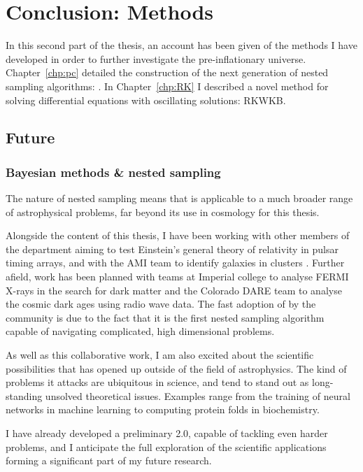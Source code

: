 \chapter*[Conclusion: Methods]{Conclusion: Methods}

In this second part of the thesis, an account has been given of the methods I have developed in order to further investigate the pre-inflationary universe. Chapter~\ref{chp:pc} detailed the construction of the next generation of nested sampling algorithms: \PolyChord{}. In Chapter~\ref{chp:RK} I described a novel method for solving differential equations with oscillating solutions: RKWKB\@.

\section*{Future}
\subsection*{Bayesian methods \& nested sampling}
The nature of nested sampling means that \PolyChord{} is applicable to a much broader range of astrophysical problems, far beyond its use in cosmology for this thesis. 

Alongside the content of this thesis, I have been working with other members of the department aiming to test Einstein's general theory of relativity in pulsar timing arrays, and with the AMI team to identify galaxies in clusters \citep{Rumsey}. Further afield, work has been planned with teams at Imperial college to analyse FERMI X-rays in the search for dark matter and the Colorado DARE team to analyse the cosmic dark ages using radio wave data. The fast adoption of \PolyChord{} by the community is due to the fact that it is the first nested sampling algorithm capable of navigating complicated, high dimensional problems.

As well as this collaborative work, I am also excited about the scientific possibilities that \PolyChord{} has opened up outside of the field of astrophysics. The kind of problems it attacks are ubiquitous in science, and tend to stand out as long-standing unsolved theoretical issues. Examples range from the training of neural networks in machine learning to computing protein folds in biochemistry.

I have already developed a preliminary \PolyChord{} 2.0, capable of tackling even harder problems, and I anticipate the full exploration of the scientific applications forming a significant part of my future research. 

